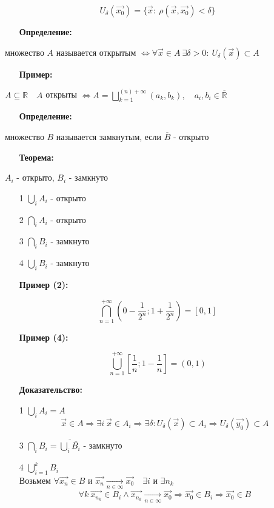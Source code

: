 \documentclass[12pt, letterpaper, twoside]{article}
\begin{document}
$$U_\delta(\vec{x_0}) = \{ \vec{x}:\ \rho (\vec{x}, \vec{x_0}) < \delta \}$$
\begin{enumerate}
    \item[\textbf{Определение:}]
\end{enumerate}
множество $A$ называется открытым $\Leftrightarrow \forall \vec{x} \in A\ \exists \delta > 0:
\ U_\delta(\vec{x})\subset A$
\begin{enumerate}
    \item[\textbf{Пример:}]
\end{enumerate}
$A\subseteq \mathbb{R}\quad A$ открыты $\Leftrightarrow A = \bigsqcup\limits_{k = 1}^{(n)+\infty} (a_k, b_k),\quad a_i, b_i\in \overline{\mathbb{R}}$\\
\begin{enumerate}
    \item[\textbf{Определение:}]
\end{enumerate}
множество $B$ называется замкнутым, если $\overline{B}$ - открыто\\
\begin{enumerate}
    \item[\textbf{Теорема:}]
\end{enumerate}
$A_i$ - открыто, $B_i$ - замкнуто
\begin{enumerate}
    \item [1] $\bigcup\limits_i A_i$ - открыто
    \item [2] $\bigcap\limits_i A_i$ - открыто
    \item [3] $\bigcap\limits_i B_i$ - замкнуто
    \item [4] $\bigcup\limits_i B_i$ - замкнуто
\end{enumerate}
\begin{enumerate}
    \item[\textbf{Пример (2):}]
\end{enumerate}
$$\bigcap_{n = 1}^{+\infty}\left( 0 - \dfrac{1}{2^n}; 1 + \dfrac{1}{2^n} \right) = [0 ,1]$$
\newpage\begin{enumerate}
    \item[\textbf{Пример (4):}]
\end{enumerate}
$$\bigcup_{n = 1}^{+\infty}\left[\dfrac{1}{n}; 1 - \dfrac{1}{n}\right] = (0, 1)$$
\begin{enumerate}
    \item[\textbf{Доказательство:}]
\end{enumerate}
\begin{enumerate}
    \item [1] $\bigcup\limits_i A_i = A$   $$\vec{x}\in A\Rightarrow \exists i\ \vec{x} \in A_i \Rightarrow \exists \delta: U_\delta(\vec{x})\subset A_i\Rightarrow U_\delta(\vec{y_0})\subset A$$
    \item [3] $\bigcap\limits_i B_i = \overline{\bigcup\limits_i \overline{B_i}}$ - замкнуто
    \item [4] $\bigcup\limits_{i = 1}^{k} B_i$\\
    Возьмем $\forall \vec{x_n}\in B$ и $\vec{x_n} \underset{n\in\infty}{\longrightarrow} \vec{x_0}\quad \exists i$ и  $\exists n_k$
    $$\forall k\ \vec{x_{n_k}}\in B_i\wedge \vec{x_{n_k}} \underset{n\in\infty}{\longrightarrow} \vec{x_0}\Rightarrow \vec{x_0}\in B_i \Rightarrow \vec{x_0}\in B$$
\end{enumerate}
\end{document}
